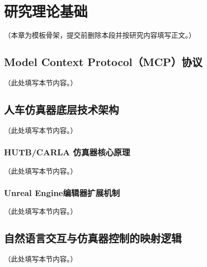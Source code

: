 
\chapter{研究理论基础}

（本章为模板骨架，提交前删除本段并按研究内容填写正文。）

\section{Model Context Protocol（MCP）协议}

（此处填写本节内容。）

\section{人车仿真器底层技术架构}

（此处填写本节内容。）

\subsection{HUTB/CARLA 仿真器核心原理}

（此处填写本节内容。）

\subsection{Unreal Engine编辑器扩展机制}

（此处填写本节内容。）

\section{自然语言交互与仿真器控制的映射逻辑}

（此处填写本节内容。）
